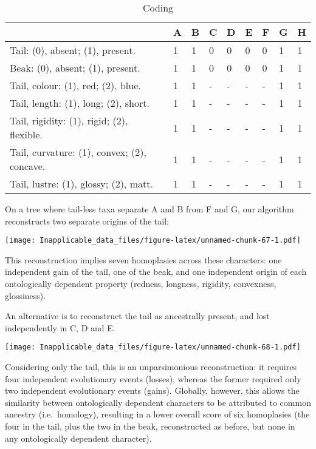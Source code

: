\documentclass[]{book}
\theoremstyle{definition}
\theoremstyle{definition}
\theoremstyle{definition}
\theoremstyle{remark}
\begin{document}
\begin{table}

\caption{\label{tab:unnamed-chunk-66}Coding}
\centering
\begin{tabular}[t]{l|l|l|l|l|l|l|l|l}
\hline
  & A & B & C & D & E & F & G & H\\
\hline
Tail: (0), absent; (1), present. & 1 & 1 & 0 & 0 & 0 & 0 & 1 & 1\\
\hline
Beak: (0), absent; (1), present. & 1 & 1 & 0 & 0 & 0 & 0 & 1 & 1\\
\hline
Tail, colour: (1), red; (2), blue. & 1 & 1 & - & - & - & - & 1 & 1\\
\hline
Tail, length: (1), long; (2), short. & 1 & 1 & - & - & - & - & 1 & 1\\
\hline
Tail, rigidity: (1), rigid; (2), flexible. & 1 & 1 & - & - & - & - & 1 & 1\\
\hline
Tail, curvature: (1), convex; (2), concave. & 1 & 1 & - & - & - & - & 1 & 1\\
\hline
Tail, lustre: (1), glossy; (2), matt. & 1 & 1 & - & - & - & - & 1 & 1\\
\hline
\end{tabular}
\end{table}

On a tree where tail-less taxa separate A and B from F and G, our
algorithm reconstructs two separate origins of the tail:

\texttt{[image: Inapplicable\_data\_files/figure-latex/unnamed-chunk-67-1.pdf]}

This reconstruction implies seven homoplasies across these characters:
one independent gain of the tail, one of the beak, and one independent
origin of each ontologically dependent property (redness, longness,
rigidity, convexness, glossiness).

An alternative is to reconstruct the tail as ancestrally present, and
lost independently in C, D and E.

\texttt{[image: Inapplicable\_data\_files/figure-latex/unnamed-chunk-68-1.pdf]}

Considering only the tail, this is an unparsimonious reconstruction: it
requires four independent evolutionary events (losses), whereas the
former required only two independent evolutionary events (gains).
Globally, however, this allows the similarity between ontologically
dependent characters to be attributed to common ancestry
(i.e.~homology), resulting in a lower overall score of six homoplasies
(the four in the tail, plus the two in the beak, reconstructed as
before, but none in any ontologically dependent character).
\end{document}
